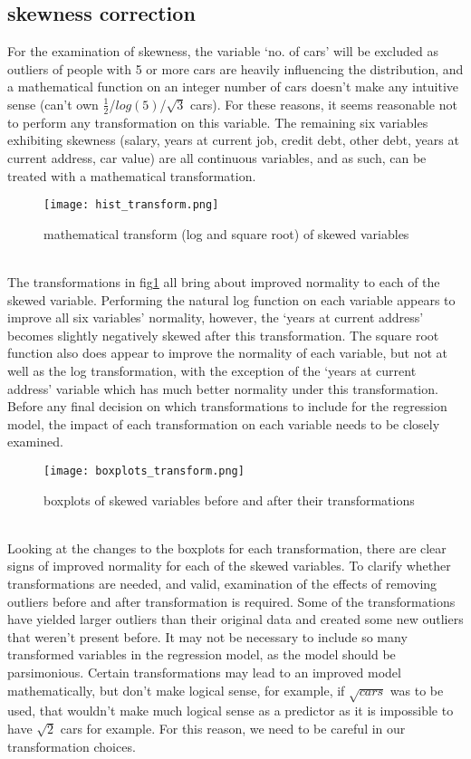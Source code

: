 \documentclass[journal]{IEEEtran}
\begin{document}
\subsection{skewness correction}
\label{skew}
For the examination of skewness, the variable `no. of cars' will be excluded as outliers of people with 5 or more cars are heavily influencing the distribution, and a mathematical function on an integer number of cars doesn't make any intuitive sense (can't own $\frac{1}{2}$/$log(5)$/$\sqrt{3}$ cars). For these reasons, it seems reasonable not to perform any transformation on this variable. The remaining six variables exhibiting skewness (salary, years at current job, credit debt, other debt, years at current address, car value) are all continuous variables, and as such, can be treated with a mathematical transformation. \\
\begin{figure}[h]
    \centering
	   \texttt{[image: hist\_transform.png]}
	   \caption{mathematical transform (log and square root) of skewed variables}
    \label{fig:transforms}
\end{figure}
\\\indent
The transformations in fig\ref{fig:transforms} all bring about improved normality to each of the skewed variable.\cite{intro_to_stat_and_data_analysis_transforms} Performing the natural log function on each variable appears to improve all six variables' normality, however, the `years at current address' becomes slightly negatively skewed after this transformation. The square root function also does appear to improve the normality of each variable, but not at well as the log transformation, with the exception of the `years at current address' variable which has much better normality under this transformation. 
\\\indent
Before any final decision on which transformations to include for the regression model, the impact of each transformation on each variable needs to be closely examined. 
\begin{figure}[h]
    \centering
	   \texttt{[image: boxplots\_transform.png]}
	   \caption{boxplots of skewed variables before and after their  transformations}
    \label{fig:boxtransforms}
\end{figure}
\\\indent
Looking at the changes to the boxplots for each transformation, there are clear signs of improved normality for each of the skewed variables. To clarify whether transformations are needed, and valid, examination of the effects of removing outliers before and after transformation is required.\cite{intro_to_stat_learning_outliers} Some of the transformations have yielded larger outliers than their original data and created some new outliers that weren't present before. It may not be necessary to include so many transformed variables in the regression model, as the model should be parsimonious\cite{parsimony}. Certain transformations may lead to an improved model mathematically, but don't make logical sense, for example, if $\sqrt{cars}$ was to be used, that wouldn't make much logical sense as a predictor as it is impossible to have $\sqrt{2}$ cars for example. For this reason, we need to be careful in our transformation choices. 
\end{document}
